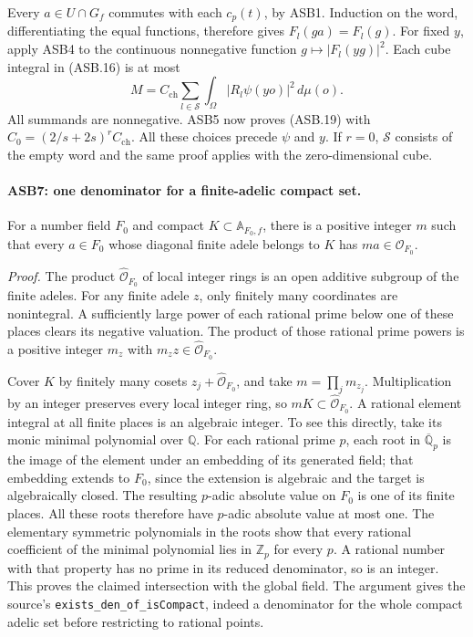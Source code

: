 Every \(a\in U\cap G_f\) commutes with each \(c_p(t)\), by ASB1.
Induction on the word, differentiating the equal functions,
therefore gives \(F_l(ga)=F_l(g)\).
For fixed \(y\), apply ASB4 to the continuous nonnegative
function \(g\mapsto|F_l(yg)|^2\).
Each cube integral in (ASB.16) is at most
\[
 M=C_{\mathrm{ch}}\sum_{l\in\mathcal S}
                             \int_\Omega|R_l\psi(yo)|^2\,d\mu(o).
 \tag{ASB.20}
\]
All summands are nonnegative.  ASB5 now proves (ASB.19) with
\(C_0=(2/s+2s)^rC_{\mathrm{ch}}\).
All these choices precede \(\psi\) and \(y\).
If \(r=0\), \(\mathcal S\) consists of the empty word and the
same proof applies with the zero-dimensional cube.

\paragraph{ASB7: one denominator for a finite-adelic compact set.}
\label{claim:ASB7}
For a number field \(F_0\) and compact
\(K\subset\mathbb A_{F_0,f}\), there is a positive integer \(m\)
such that every \(a\in F_0\) whose diagonal finite adele belongs
to \(K\) has \(ma\in\mathcal O_{F_0}\).

\emph{Proof.}
The product \(\widehat{\mathcal O}_{F_0}\) of local integer
rings is an open additive subgroup of the finite adeles.
For any finite adele \(z\), only finitely many coordinates are
nonintegral.  A sufficiently large power of each rational prime
below one of these places clears its negative valuation.
The product of those rational prime powers is a positive integer
\(m_z\) with \(m_zz\in\widehat{\mathcal O}_{F_0}\).

Cover \(K\) by finitely many cosets
\(z_j+\widehat{\mathcal O}_{F_0}\), and take \(m=\prod_jm_{z_j}\).
Multiplication by an integer preserves every local integer ring,
so \(mK\subset\widehat{\mathcal O}_{F_0}\).
A rational element integral at all finite places is an algebraic
integer.  To see this directly, take its monic minimal polynomial
over \(\mathbb Q\).  For each rational prime \(p\), each root in
\(\overline{\mathbb Q}_p\) is the image of the element under an
embedding of its generated field; that embedding extends to
\(F_0\), since the extension is algebraic and the target is
algebraically closed.  The resulting \(p\)-adic absolute value
on \(F_0\) is one of its finite places.  All these roots therefore
have \(p\)-adic absolute value at most one.  The elementary
symmetric polynomials in the roots show that every rational
coefficient of the minimal polynomial lies in \(\mathbb Z_p\)
for every \(p\).  A rational number with that property has no
prime in its reduced denominator, so is an integer.
This proves the claimed intersection with the global field.
The argument gives the source's
\texttt{exists\_den\_of\_isCompact}, indeed a denominator for
the whole compact adelic set before restricting to rational points.

